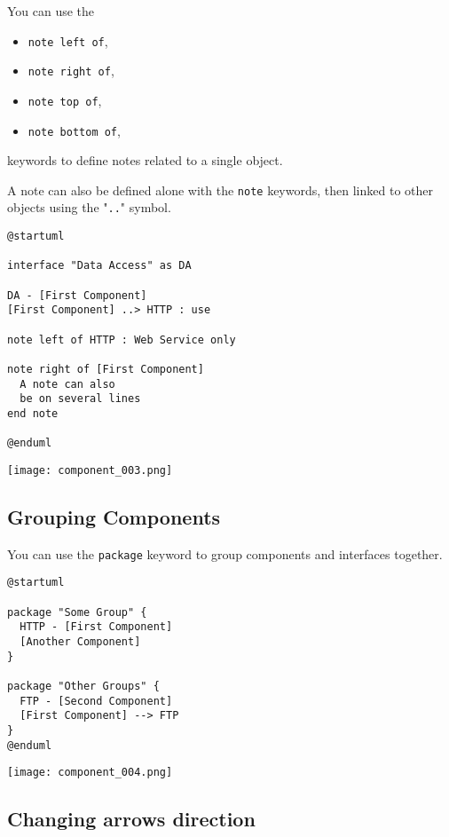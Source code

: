 You can use the
\begin{itemize}
  \item \texttt{note left of}, 
  \item \texttt{note right of},
  \item \texttt{note top of},
  \item \texttt{note bottom of},  
\end{itemize}
keywords to define notes related to a single object.

A note can  also be defined alone with the \texttt{note} keywords, then linked
to other objects using the "\texttt{..}" symbol.

\begin{lstlisting}
@startuml

interface "Data Access" as DA

DA - [First Component] 
[First Component] ..> HTTP : use

note left of HTTP : Web Service only

note right of [First Component]
  A note can also
  be on several lines
end note

@enduml
\end{lstlisting}

\begin{center}
\texttt{[image: component\_003.png]}
\end{center}

\newpage \subsection{Grouping Components}

You can use the \texttt{package} keyword to group components and interfaces
together.

\begin{lstlisting}
@startuml

package "Some Group" {
  HTTP - [First Component]
  [Another Component]
}
 
package "Other Groups" {
  FTP - [Second Component]
  [First Component] --> FTP
}
@enduml
\end{lstlisting}

\begin{center}
\texttt{[image: component\_004.png]}
\end{center}

\newpage \subsection{Changing arrows direction}

